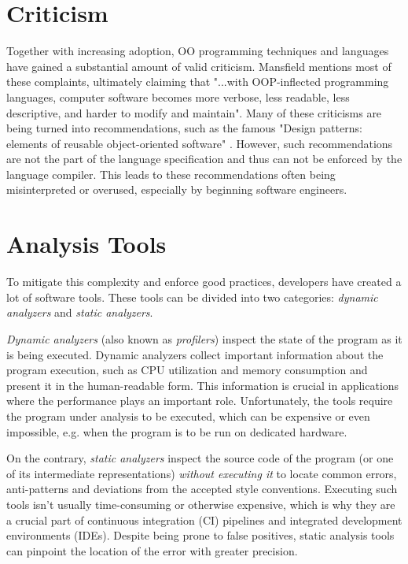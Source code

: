 \section{Criticism}

Together with increasing adoption, OO programming techniques and languages have gained a substantial amount of valid criticism. Mansfield \cite{oopfailed} mentions most of these complaints, ultimately claiming that "...with OOP-inflected programming languages, computer software becomes more
verbose, less readable, less descriptive, and harder to modify and maintain". Many of these criticisms are being turned into recommendations, such as the famous "Design patterns: elements of reusable object-oriented software" \cite{GOFPatterns}. However, such recommendations are not the part of the language specification and thus can not be enforced by the language compiler. This leads to these recommendations often being misinterpreted or overused, especially by beginning software engineers.

\section{Analysis Tools}
To mitigate this complexity and enforce good practices, developers have created a lot of software tools. These tools can be divided into two categories: \textit{dynamic analyzers} and \textit{static analyzers}.

\textit{Dynamic analyzers} (also known as \textit{profilers}) inspect the state of the program as it is being executed. Dynamic analyzers collect important information about the program execution, such as CPU utilization and memory consumption and present it in the human-readable form. This information is crucial in applications where the performance plays an important role. Unfortunately, the tools require the program under analysis to be executed, which can be expensive or even impossible, e.g. when the program is to be run on dedicated hardware.

On the contrary, \textit{static analyzers} inspect the source code of the program (or one of its intermediate representations) \textit{without executing it} to locate common errors, anti-patterns and deviations from the accepted style conventions. Executing such tools isn't usually time-consuming or otherwise expensive, which is why they are a crucial part of continuous integration (CI) pipelines and integrated development environments (IDEs).
Despite being prone to false positives, static analysis tools can pinpoint the location of the error with greater precision.

